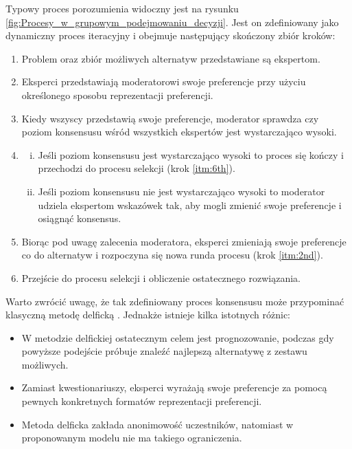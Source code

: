 Typowy proces
porozumienia widoczny jest na rysunku
\ref{fig:Procesy_w_grupowym_podejmowaniu_decyzji}. Jest on zdefiniowany jako
dynamiczny proces iteracyjny i obejmuje następujący skończony zbiór kroków:
\begin{enumerate}[1.]
  \item Problem oraz zbiór możliwych alternatyw przedstawiane są ekspertom.
  
  \item \label{itm:2nd} Eksperci przedstawiają moderatorowi swoje preferencje
  przy użyciu określonego sposobu reprezentacji preferencji.
  
  \item Kiedy wszyscy przedstawią swoje preferencje, moderator sprawdza czy 
  poziom konsensusu wśród wszystkich ekspertów jest wystarczająco wysoki.
  
  \item 
  \begin{enumerate}[i)]
    \item Jeśli poziom konsensusu jest wystarczająco wysoki to proces się kończy
    i przechodzi do procesu selekcji (krok \ref{itm:6th}).
	\item Jeśli poziom konsensusu nie jest wystarczająco wysoki to moderator 
	udziela ekspertom wskazówek tak, aby mogli zmienić swoje preferencje i 
	osiągnąć konsensus.
  \end{enumerate}
  
  \item Biorąc pod uwagę zalecenia moderatora, eksperci zmieniają swoje
  preferencje co do alternatyw i rozpoczyna się nowa runda procesu (krok
  \ref{itm:2nd}).
  
  \item \label{itm:6th} Przejście do procesu selekcji i obliczenie
  ostatecznego rozwiązania.

\end{enumerate}

Warto zwrócić uwagę, że tak zdefiniowany proces konsensusu może przypominać 
klasyczną metodę delficką \cite{Helmer-Hirschberg1967}. Jednakże istnieje kilka
istotnych różnic:
\begin{itemize}
  \item W metodzie delfickiej ostatecznym celem jest prognozowanie, podczas gdy 
  powyższe podejście próbuje znaleźć najlepszą alternatywę z zestawu możliwych.
  \item Zamiast kwestionariuszy, eksperci wyrażają swoje preferencje za pomocą 
  pewnych konkretnych formatów reprezentacji preferencji.
  \item Metoda delficka zakłada anonimowość uczestników, natomiast w 
  proponowanym modelu nie ma takiego ograniczenia.
\end{itemize}

